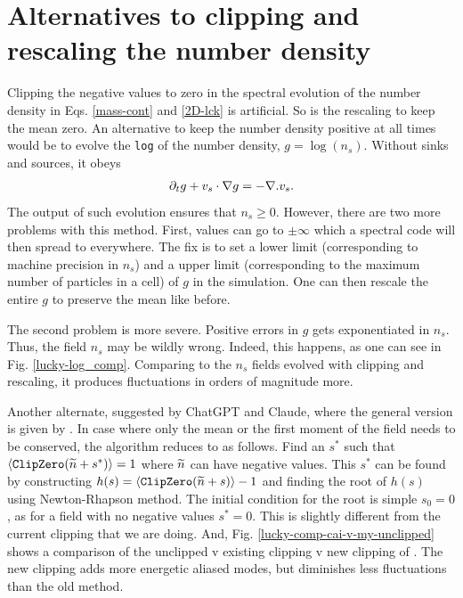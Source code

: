 \documentclass[../Rajarshi-thesis-draft.tex]{subfiles}
\begin{document}
\section{Alternatives to clipping and rescaling the number density}\label{clip-alt}
Clipping the negative values to zero in the spectral evolution of the number density in Eqs. \eqref{mass-cont} and \eqref{2D-lck} is artificial. So is the rescaling to keep the mean zero. An alternative to keep the number density positive at all times would be to evolve the \texttt{log} of the number density, $g = \log(n_s)$. Without sinks and sources, it obeys
\begin{align}
\label{lucky-log-cont}
\begin{split}
    \partial_t g + v_s\cdot\nabla g = - \nabla . {v_s}.
\end{split}
\end{align}
The output of such evolution ensures that $n_s\geq 0$. However, there are two more problems with this method. First, values can go to $\pm \infty$ which a spectral code will then spread to everywhere. The fix is to set a lower limit (corresponding to machine precision in $n_s$) and a upper limit (corresponding to the maximum number of particles in a cell) of $g$ in the simulation. One can then rescale the entire $g$ to preserve the mean like before.

The second problem is more severe. Positive errors in $g$ gets exponentiated in $n_s$. Thus, the field $n_s$ may be wildly wrong. Indeed, this happens, as one can see in Fig. \ref{lucky-log_comp}. Comparing to the $n_s$ fields evolved with clipping and rescaling, it produces fluctuations in orders of magnitude more.

Another alternate, suggested by ChatGPT and Claude, where the  general version is given by \cite{cai2024}. In case where only the mean or the first moment of the field needs to be conserved, the algorithm reduces to as follows. Find an $s^*$ such that $\langle \texttt{ClipZero}(\widetilde{n} + s^*)\rangle = 1$ where $\widetilde{n}$ can have negative values. This $s^{*}$ can be found by constructing $h(s) = \langle \texttt{ClipZero}(\widetilde{n} + s)\rangle -1$ and finding the root of $h(s)$ using Newton-Rhapson method. The initial condition for the root is simple $s_0 = 0$, as for a field with no negative values $s^* = 0$. This is slightly different from the current clipping that we are doing. And, Fig. \ref{lucky-comp-cai-v-my-unclipped} shows a comparison of the unclipped v existing clipping v new clipping of \cite{cai2024}. The new clipping adds more energetic aliased modes, but diminishes less fluctuations than the old method.
\end{document}
